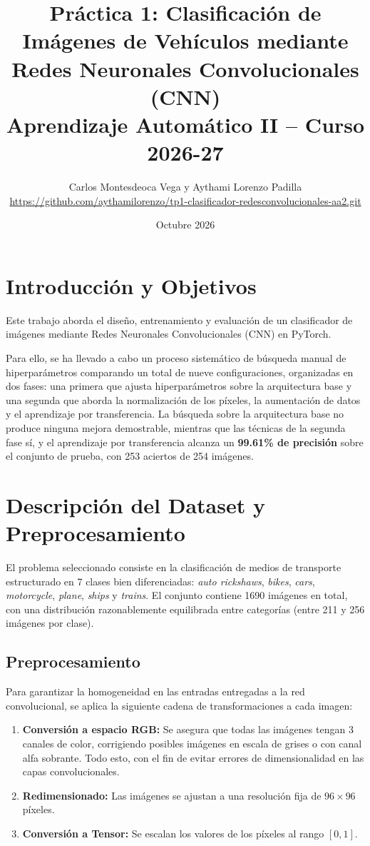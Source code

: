 \documentclass[11pt, a4paper]{article}
\title{\textbf{\Large Práctica 1: Clasificación de Imágenes de Vehículos mediante Redes Neuronales Convolucionales (CNN)}\\
\large Aprendizaje Automático II -- Curso 2026-27}
\author{
    Carlos Montesdeoca Vega \quad y \quad Aythami Lorenzo Padilla \\
    \small \url{https://github.com/aythamilorenzo/tp1-clasificador-redesconvolucionales-aa2.git}
}
\date{Octubre 2026}
\begin{document}
\maketitle

{
  \vspace{-1cm}
  \renewcommand{\contentsname}{} 
  \tableofcontents
  \vspace{-1cm}
}

\newpage

\section{Introducción y Objetivos}
Este trabajo aborda el diseño, entrenamiento y evaluación de un clasificador de imágenes mediante Redes Neuronales Convolucionales (CNN) en PyTorch. 

Para ello, se ha llevado a cabo un proceso sistemático de búsqueda manual de hiperparámetros comparando un total de nueve configuraciones, organizadas en dos fases: una primera que ajusta hiperparámetros sobre la arquitectura base y una segunda que aborda la normalización de los píxeles, la aumentación de datos y el aprendizaje por transferencia. La búsqueda sobre la arquitectura base no produce ninguna mejora demostrable, mientras que las técnicas de la segunda fase sí, y el aprendizaje por transferencia alcanza un \textbf{99.61\% de precisión} sobre el conjunto de prueba, con 253 aciertos de 254 imágenes.

\section{Descripción del Dataset y Preprocesamiento}
El problema seleccionado consiste en la clasificación de medios de transporte estructurado en 7 clases bien diferenciadas: \textit{auto rickshaws}, \textit{bikes}, \textit{cars}, \textit{motorcycle}, \textit{plane}, \textit{ships} y \textit{trains}. El conjunto contiene 1690 imágenes en total, con una distribución razonablemente equilibrada entre categorías (entre 211 y 256 imágenes por clase).

\subsection{Preprocesamiento}
Para garantizar la homogeneidad en las entradas entregadas a la red convolucional, se aplica la siguiente cadena de transformaciones a cada imagen:
\begin{enumerate}
    \item \textbf{Conversión a espacio RGB:} Se asegura que todas las imágenes tengan 3 canales de color, corrigiendo posibles imágenes en escala de grises o con canal alfa sobrante. Todo esto, con el fin de evitar errores de dimensionalidad en las capas convolucionales.
    \item \textbf{Redimensionado:} Las imágenes se ajustan a una resolución fija de $96 \times 96$ píxeles.
    \item \textbf{Conversión a Tensor:} Se escalan los valores de los píxeles al rango $[0, 1]$.
\end{enumerate}
\end{document}
